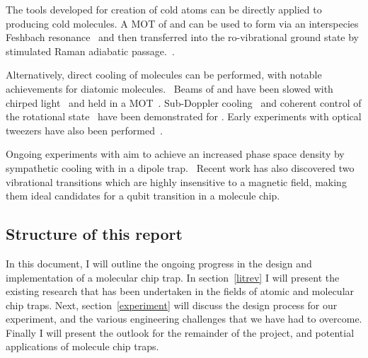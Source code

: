 The tools developed for creation of cold atoms can be directly applied to
producing cold molecules. A MOT of \esRb{} and \ootCs can be used to form
\RbCs{} via an interspecies Feshbach resonance~\cite{PhysRevA.85.032506,
PhysRevA.89.033604} and then transferred into the ro-vibrational ground state by
stimulated Raman adiabatic passage.~\cite{PhysRevLett.113.255301,
RevModPhys.70.1003}.

Alternatively, direct cooling of molecules can be performed, with notable
achievements for diatomic molecules.~\cite{Shuman2010} Beams of \SrF{} and
\CaF{} have been slowed with chirped light~\cite{PhysRevLett.108.103002,
Truppe2017a} and held in a MOT~\cite{Barry2014, Williams2017}. Sub-Doppler
cooling~\cite{Truppe2017} and coherent control of the rotational
state~\cite{Williams2018, Blackmore_2018} have been demonstrated for
\CaF{}. Early experiments with optical tweezers have also been
performed~\cite{Anderegg2019}.


Ongoing experiments with \CaF{} aim to achieve an increased phase space density by
sympathetic cooling with \esRb{} in a dipole trap.~ Recent
work has also discovered two vibrational transitions which are highly
insensitive to a magnetic field, making them ideal candidates for a qubit
transition in a molecule chip. 

\subsection{Structure of this report}

In this document, I will outline the ongoing progress in the design and
implementation of a molecular chip trap. In section~\ref{litrev} I will present
the existing research that has been undertaken in the fields of atomic and
molecular chip traps. Next, section~\ref{experiment} will discuss the design
process for our experiment, and the various engineering challenges that we have
had to overcome. Finally I will present the outlook for the remainder of the
project, and potential applications of molecule chip traps.
